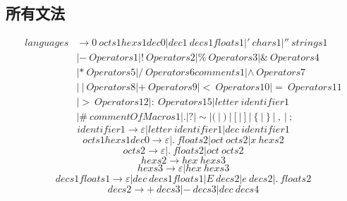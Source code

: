 \documentclass[UTF8]{ctexart}
\begin{document}
\subsection{所有文法}
\begin{equation}
	\begin{aligned}
		languages & \rightarrow 0 \ octs1hexs1dec0 | dec1 \ decs1floats1 | ' \ chars1 | '' \ strings1                                   \\
		          & | - \ Operators1 | ! \ Operators2 | \% \ Operators3  | \& \ Operators4                                              \\
		          & | * \ Operators5  | / \ Operators6comments1 | \wedge \ Operators7                                                   \\
		          & | \ | \ Operators8 | + \ Operators9  | < \ Operators10 | = \ Operators11                                            \\
		          & | > \ Operators12  | \colon \ Operators15 | letter \ identifier1                                                    \\
		          & | \# \ commentOfMacros1  | . | ? | \sim | (  \ | \  )  \ | \  [  \ | \  ]  \ | \  \{  \ | \  \}  \ | \  ,  \ | \  ;
	\end{aligned}
\end{equation}
\begin{equation}
	identifier1 \rightarrow \varepsilon | letter \ identifier1 | dec \ identifier1
\end{equation}
\begin{equation}
	octs1hexs1dec0 \rightarrow \varepsilon | . \ floats2 | oct \ octs2 | x \ hexs2
\end{equation}
\begin{equation}
	octs2 \rightarrow \varepsilon | . \ floats2 | oct \ octs2
\end{equation}
\begin{equation}
	hexs2 \rightarrow hex \ hexs3
\end{equation}
\begin{equation}
	hexs3 \rightarrow \varepsilon | hex \ hexs3
\end{equation}
\begin{equation}
	decs1floats1 \rightarrow \varepsilon | dec \ decs1floats1 | E \ decs2 | e \ decs2 | . \ floats2
\end{equation}
\begin{equation}
	decs2 \rightarrow + \ decs3 | - \ decs3 | dec \ decs4
\end{equation}
\end{document}
